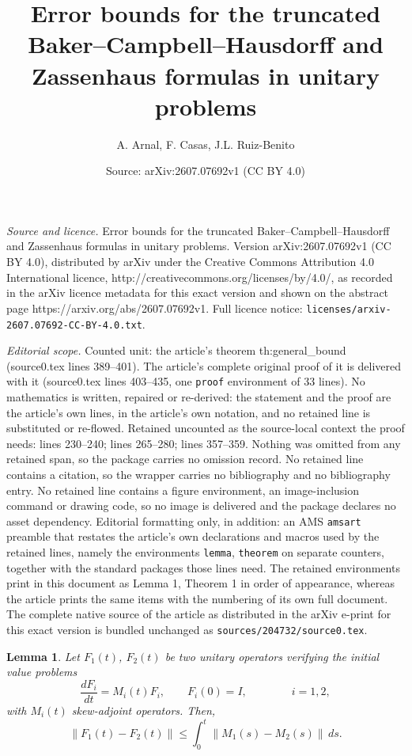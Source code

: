 \documentclass[10pt,a4paper]{amsart}
\title{Error bounds for the truncated Baker--Campbell--Hausdorff and Zassenhaus formulas in unitary problems}
\author{A. Arnal, F. Casas, J.L. Ruiz-Benito}
\date{Source: arXiv:2607.07692v1 (CC BY 4.0)}
\newtheorem{lemma}{Lemma}
\begin{document}
\maketitle

\noindent\emph{Source and licence.} Error bounds for the truncated Baker--Campbell--Hausdorff and Zassenhaus formulas in unitary problems. Version arXiv:2607.07692v1 (CC BY 4.0), distributed by arXiv under the Creative Commons Attribution 4.0 International licence, http://creativecommons.org/licenses/by/4.0/, as recorded in the arXiv licence metadata for this exact version and shown on the abstract page https://arxiv.org/abs/2607.07692v1. Full licence notice: \texttt{licenses/arxiv-2607.07692-CC-BY-4.0.txt}.\par\smallskip

\noindent\textit{Editorial scope.} Counted unit: the article's theorem th:general\_bound (source0.tex lines 389--401). The article's complete original proof of it is delivered with it (source0.tex lines 403--435, one \texttt{proof} environment of 33 lines). No mathematics is written, repaired or re-derived: the statement and the proof are the article's own lines, in the article's own notation, and no retained line is substituted or re-flowed.  Retained uncounted as the source-local context the proof needs: lines 230--240; lines 265--280; lines 357--359.  Nothing was omitted from any retained span, so the package carries no omission record.  No retained line contains a citation, so the wrapper carries no bibliography and no bibliography entry.  No retained line contains a figure environment, an image-inclusion command or drawing code, so no image is delivered and the package declares no asset dependency.  Editorial formatting only, in addition: an AMS \texttt{amsart} preamble that restates the article's own declarations and macros used by the retained lines, namely the environments \texttt{lemma}, \texttt{theorem} on separate counters, together with the standard packages those lines need.  The retained environments print in this document as Lemma 1, Theorem 1 in order of appearance, whereas the article prints the same items with the numbering of its own full document.  The complete native source of the article as distributed in the arXiv e-print for this exact version is bundled unchanged as \texttt{sources/204732/source0.tex}.
\begin{lemma} \label{lemma_estimate}
Let $F_1(t)$, $F_2(t)$ be two unitary operators verifying the initial value problems
\begin{equation} \label{ivp_2op}
   \frac{d F_i}{dt} = M_i(t) F_i, \qquad F_i(0) = I, \qquad\qquad i=1,2,
\end{equation}
with $M_i(t)$ skew-adjoint operators. Then,
\[
\|F_1(t) - F_2(t)\| \leq 
\int_0^t \| M_1(s) - M_2(s)\| \, ds.
\]
\end{lemma}  
\end{document}
